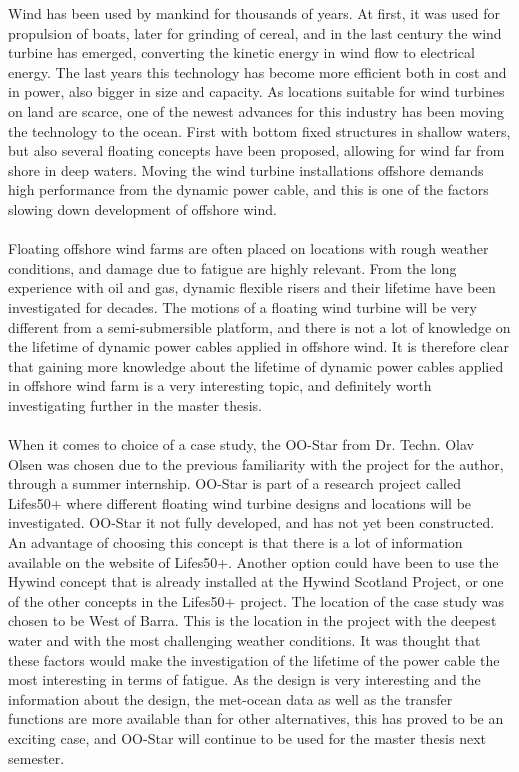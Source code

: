  Wind has been used by mankind for thousands of years. At first, it was used for propulsion of boats, later for grinding of cereal, and in the last century the wind turbine has emerged, converting the kinetic energy in wind flow to electrical energy. The last years this technology has become more efficient both in cost and in power, also bigger in size and capacity. As locations suitable for wind turbines on land are scarce, one of the newest advances for this industry has been moving the technology to the ocean. First with bottom fixed structures in shallow waters, but also several floating concepts have been proposed, allowing for wind far from shore in deep waters. Moving the wind turbine installations offshore demands high performance from the dynamic power cable, and this is one of the factors slowing down development of offshore wind.\\\\ Floating offshore wind farms are often placed on locations with rough weather conditions, and damage due to fatigue are highly relevant. From the long experience with oil and gas, dynamic flexible risers and their lifetime have been investigated for decades. The motions of a floating wind turbine will be very different from a semi-submersible platform, and there is not a lot of knowledge on the lifetime of dynamic power cables applied in offshore wind. It is therefore clear that gaining more knowledge about the lifetime of dynamic power cables applied in offshore wind farm is a very interesting topic, and definitely worth investigating further in the master thesis. \\\\ When it comes to choice of a case study, the OO-Star from Dr. Techn. Olav Olsen was chosen due to the previous familiarity with the project for the author, through a summer internship. OO-Star is part of a research project called Lifes50+ where different floating wind turbine designs and locations will be investigated. OO-Star it not fully developed, and has not yet been constructed. An advantage of choosing this concept is that there is a lot of information available on the website of Lifes50+. Another option could have been to use the Hywind concept that is already installed at the Hywind Scotland Project, or one of the other concepts in the Lifes50+ project. The location of the case study was chosen to be West of Barra. This is the location in the project with the deepest water and with the most challenging weather conditions. It was thought that these factors would make the investigation of the lifetime of the power cable the most interesting in terms of fatigue. As the design is very interesting and the information about the design, the met-ocean data as well as the transfer functions are more available than for other alternatives, this has proved to be an exciting case, and OO-Star will continue to be used for the master thesis next semester. 
